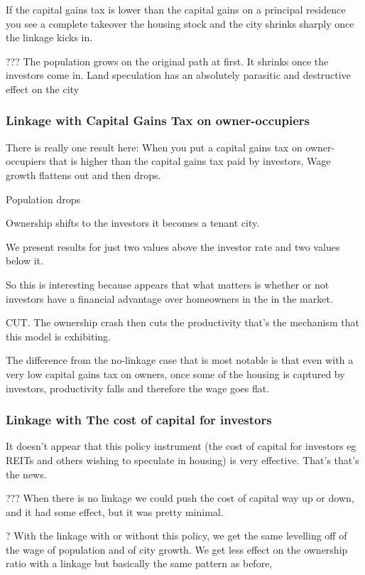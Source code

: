 \documentclass[]{article}
\begin{document}
If the capital gains tax is lower than the capital gains on a principal residence you see a complete takeover the housing stock and the city shrinks sharply once the linkage kicks in.

??? The population grows on the original path at first. It shrinks once the investors come in. Land speculation has an absolutely parasitic and destructive effect on the city

\subsubsection{Linkage with Capital Gains Tax on owner-occupiers}

There is really one result here: When you put a capital gains tax on owner-occupiers  that is higher than the capital gains tax paid by investors, Wage growth flattens out and then drops.

Population drops

Ownership shifts to the investors it becomes a tenant city.

We present results for just two values above the investor rate and two values below it.

So this is interesting because appears that what matters is whether or not investors have a financial advantage over homeowners in the in the market.

CUT. The ownership crash then cuts the productivity that’s the mechanism that this model is exhibiting.

The difference from the no-linkage case that is most notable is that even with a very low capital gains tax on owners, once some of the housing is captured by investors, productivity falls and therefore the wage goes flat.

\subsubsection{Linkage with The cost of capital for investors}

It doesn’t appear that this policy instrument (the cost of capital for investors eg REITs and others wishing to speculate in housing) is very effective. That’s that’s the news.

??? When there is no linkage we could push the cost of capital way up or down, and it had some effect, but it was pretty minimal.

? With the linkage with or without this policy, we get the same levelling off of the wage of population and of city growth. We get less effect on the ownership ratio with a linkage but basically the same pattern as before,
\end{document}
